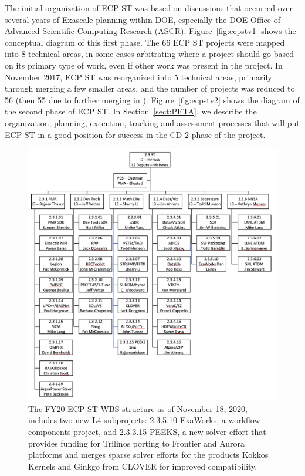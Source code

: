 The initial organization of ECP ST was based on discussions that occurred over several years of Exascale planning within DOE, especially the DOE Office of Advanced Scientific Computing Research (ASCR).  Figure~\ref{fig:ecpstv1} shows the conceptual diagram of this first phase.  The 66 ECP ST projects were mapped into 8 technical areas, in some cases arbitrating where a project should go based on its primary type of work, even if other work was present in the project.  In November 2017, ECP ST was reorganized into 5 technical areas, primarily through merging a few smaller areas, and the number of projects was reduced to 56 (then 55 due to further merging in \ecosystem).  Figure~\ref{fig:ecpstv2} shows the diagram of the second phase of ECP ST.  In Section~\ref{sect:PETA}, we describe the organization, planning, execution, tracking and assessment processes that will put ECP ST in a good position for success in the CD-2 phase of the project.

\begin{figure}
	\centering
	\includegraphics[width=0.9\linewidth]{STFY20WBS}
	\caption{\label{fig:wbs-FY20} The FY20 ECP ST WBS structure as of November 18, 2020, includes two new L4 subprojects: 2.3.5.10 ExaWorks, a workflow components project, and 2.3.3.15 PEEKS, a new solver effort that provides funding for Trilinos porting to Frontier and Aurora platforms and merges sparse solver efforts for the products Kokkos Kernels and Ginkgo from CLOVER for improved compatibility.}
\end{figure}

